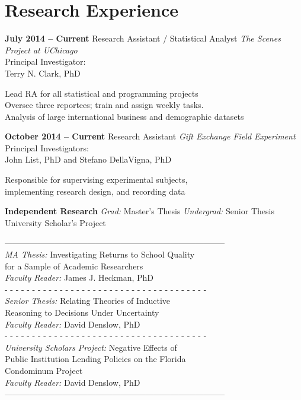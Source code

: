 \documentclass[fontsize=8pt]{ChaseCV}
\begin{document}
\section{Research Experience}

\begin{eventlist}

\item{\textbf{July 2014 -- Current}}
	{Research Assistant / Statistical Analyst}
	{\textit{The Scenes Project at UChicago} \\
	Principal Investigator: \\
	Terry N. Clark, PhD}

\textbullet{} Lead RA for all statistical and programming projects \\
\textbullet{} Oversee three reportees; train and assign weekly tasks. \\
\textbullet{} Analysis of large international business and demographic datasets \\

\item{\textbf{October 2014 -- Current}}
     {Research Assistant}
     {\textit{Gift Exchange Field Experiment} \\
     Principal Investigators: \\
     John List, PhD and Stefano DellaVigna, PhD}

\textbullet{} Responsible for supervising experimental subjects, \\
implementing research design, and recording data \\

\item{\textbf{Independent Research}}
	{\textit{Grad:} Master's Thesis}
	{\textit{Undergrad:} Senior Thesis \\
	University Scholar's Project}
	
-------------------------------------------------------------------------------- \\
\textit{MA Thesis:} Investigating Returns to School Quality \\
for a Sample of Academic Researchers \\
\textit{Faculty Reader:} James J. Heckman, PhD \\
- - - - - - - - - - - - - - - - - - - - - - - - - - - - - - - - - - - - - \\
\textit{Senior Thesis:} Relating Theories of Inductive \\
Reasoning to Decisions Under Uncertainty \\
\textit{Faculty Reader:} David Denslow, PhD \\
- - - - - - - - - - - - - - - - - - - - - - - - - - - - - - - - - - - - - \\
\textit{University Scholars Project:} Negative Effects of \\
Public Institution Lending Policies on the Florida \\
Condominum Project \\
\textit{Faculty Reader:} David Denslow, PhD \\
-------------------------------------------------------------------------------- \\


\end{eventlist}
\end{document}
